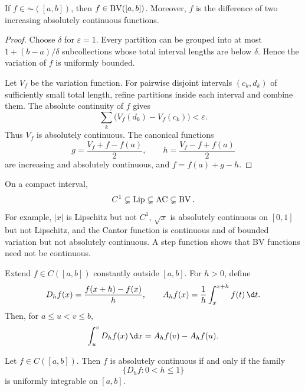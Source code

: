 \begin{thm}
If $f\in\AC([a,b])$, then $f\in\operatorname{BV}([a,b])$. Moreover, $f$ is the difference of two increasing absolutely continuous functions.
\end{thm}

\begin{proof}
Choose $\delta$ for $\varepsilon=1$. Every partition can be grouped into at most $1+(b-a)/\delta$ subcollections whose total interval lengths are below $\delta$. Hence the variation of $f$ is uniformly bounded.

Let $V_f$ be the variation function. For pairwise disjoint intervals $(c_k,d_k)$ of sufficiently small total length, refine partitions inside each interval and combine them. The absolute continuity of $f$ gives
\[
\sum_k\bigl(V_f(d_k)-V_f(c_k)\bigr)<\varepsilon.
\]
Thus $V_f$ is absolutely continuous. The canonical functions
\[
g=\frac{V_f+f-f(a)}2,
\qquad h=\frac{V_f-f+f(a)}2
\]
are increasing and absolutely continuous, and $f=f(a)+g-h$.
\end{proof}

\begin{remark}
On a compact interval,
\[
C^1\subsetneq\operatorname{Lip}\subsetneq\operatorname{AC}\subsetneq\operatorname{BV}.
\]
For example, $|x|$ is Lipschitz but not $C^1$, $\sqrt{x}$ is absolutely continuous on $[0,1]$ but not Lipschitz, and the Cantor function is continuous and of bounded variation but not absolutely continuous. A step function shows that BV functions need not be continuous.
\end{remark}

\begin{de}
Extend $f\in C([a,b])$ constantly outside $[a,b]$. For $h>0$, define
\[
D_hf(x)=\frac{f(x+h)-f(x)}h,
\qquad
A_hf(x)=\frac1h\int_x^{x+h}f(t)\,\d t.
\]
Then, for $a\leq u<v\leq b$,
\[
\int_u^vD_hf(x)\,\d x=A_hf(v)-A_hf(u).
\]
\end{de}

\begin{thm}
Let $f\in C([a,b])$. Then $f$ is absolutely continuous if and only if the family
\[
\{D_hf:0<h\leq1\}
\]
is uniformly integrable on $[a,b]$.
\end{thm}

